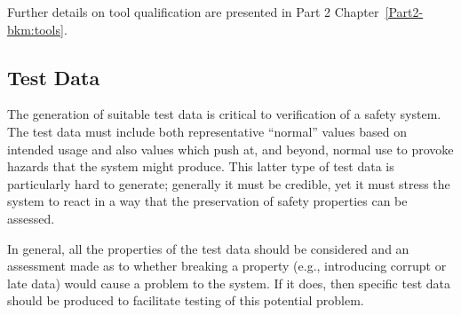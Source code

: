 
Further details on tool qualification are presented in Part 2 Chapter~\ref*{Part2-bkm:tools}.

\subsection{Test Data}
The generation of suitable test data is critical to verification of a safety system. The test data must include both representative ``normal'' values based on intended usage and also values which push at, and beyond, normal use to provoke \glspl{hazard} that the system might produce. This latter type of test data is particularly hard to generate; generally it must be credible, yet it must stress the system to react in a way that the preservation of safety properties can be assessed. 

In general, all the properties of the test data should be considered and an assessment made as to whether breaking a property (e.g., introducing corrupt or late data) would cause a problem to the system. If it does, then specific test data should be produced to facilitate testing of this potential problem.

